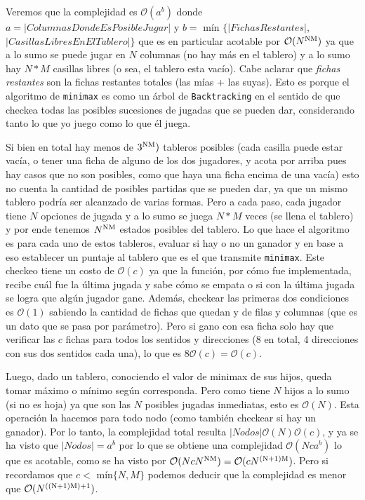 \documentclass[A4paper,oneside,fleqn,11pt]{article}
\theoremstyle{definition}
\begin{document}
Veremos que la complejidad es $\mathcal{O}(a^b)$ donde $a=|Columnas Donde Es Posible Jugar|$ y $b =$ mín $\{|FichasRestantes|$, $|Casillas Libres En El Tablero|\}$ que es en particular acotable por $\mathcal{O}(N\textsuperscript{NM})$ ya que a lo sumo se puede jugar en $N$ columnas (no hay más en el tablero) y a lo sumo hay $N*M$ casillas libres (o sea, el tablero esta vacío). Cabe aclarar que \textit{fichas restantes} son la fichas restantes totales (las mías + las suyas). Esto es porque el algoritmo de \texttt{minimax} es como un árbol de \texttt{Backtracking} en el sentido de que checkea todas las posibles sucesiones de jugadas que se pueden dar, considerando tanto lo que yo juego como lo que él juega.

Si bien en total hay menos de $3\textsuperscript{NM})$ tableros posibles (cada casilla puede estar vacía, o tener una ficha de alguno de los dos jugadores, y acota por arriba pues hay casos que no son posibles, como que haya una ficha encima de una vacía) esto no cuenta la cantidad de posibles partidas que se pueden dar, ya que un mismo tablero podría ser alcanzado de varias formas. Pero a cada paso, cada jugador tiene $N$ opciones de jugada y a lo sumo se juega $N*M$ veces (se llena el tablero) y por ende tenemos $N\textsuperscript{NM}$ estados posibles del tablero. Lo que hace el algoritmo es para cada uno de estos tableros, evaluar si hay o no un ganador y en base a eso establecer un puntaje al tablero que es el que transmite \texttt{minimax}. Este checkeo tiene un costo de $\mathcal{O}(c)$ ya que la función, por cómo fue implementada, recibe cuál fue la última jugada y sabe cómo se empata o si con la última jugada se logra que algún jugador gane. Además, checkear las primeras dos condiciones es $\mathcal{O}(1)$ sabiendo la cantidad de fichas que quedan y de filas y columnas (que es un dato que se pasa por parámetro). Pero si gano con esa ficha solo hay que verificar las $c$ fichas para todos los sentidos y direcciones (8 en total, 4 direcciones con sus dos sentidos cada una), lo que es $8 \mathcal{O}(c)= \mathcal{O}(c)$. 

Luego, dado un tablero, conociendo el valor de minimax de sus hijos, queda tomar máximo o mínimo según corresponda. Pero como tiene $N$ hijos a lo sumo (si no es hoja) ya que son las $N$ posibles jugadas inmediatas, esto es $\mathcal{O}(N)$. Esta operación la hacemos para todo nodo (como también checkear si hay un ganador). Por lo tanto, la complejidad total resulta $|Nodos|\mathcal{O}(N)\mathcal{O}(c)$, y ya se ha visto que $|Nodos|=a^b$ por lo que se obtiene una complejidad $\mathcal{O}(N c a^b)$ lo que es acotable, como se ha visto por $\mathcal{O}(N c N\textsuperscript{NM})=\mathcal{O}(c N\textsuperscript{(N+1)M})$. Pero si recordamos que $c<$ mín$\{N,M\}$ podemos deducir que la complejidad es menor que $\mathcal{O}(N\textsuperscript{((N+1)M)+1})$.
\end{document}
